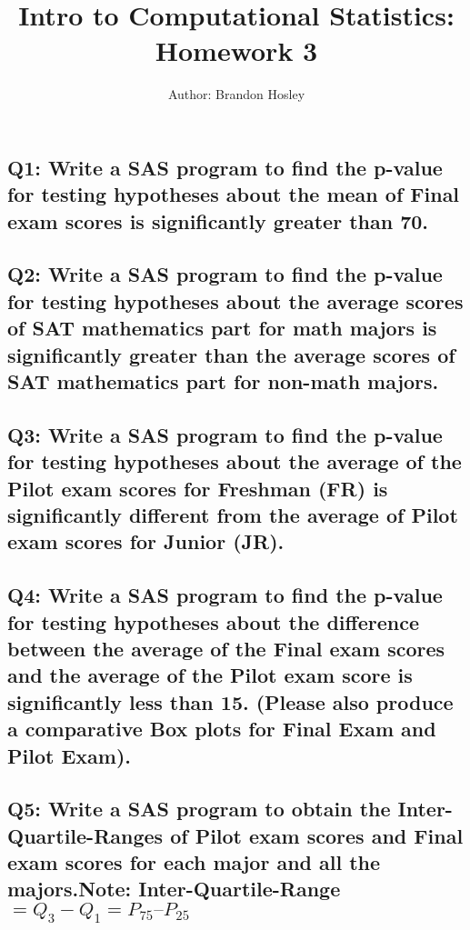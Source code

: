 \documentclass[a4paper,man,natbib]{apa6}
\title{Intro to Computational Statistics: Homework 3}
\author{Author: Brandon Hosley}
\affiliation{Instructor: Liang Kong, Ph.D}
\begin{document}
\maketitle
\singlespacing
	
\subsection*{Q1: Write a SAS program to find the p-value for testing hypotheses about the mean of Final exam scores is significantly greater than 70. }
%

\subsection*{Q2: Write a SAS program to find the p-value for testing hypotheses about the average scores of SAT mathematics part for math majors is significantly greater than the average scores of SAT mathematics part for non-math majors. }


\subsection*{Q3: Write a SAS program to find the p-value for testing hypotheses about the average of the Pilot exam scores for Freshman (FR) is significantly different from the average of Pilot exam scores for Junior (JR). }


\subsection*{Q4: Write a SAS program to find the p-value for testing hypotheses about the difference between the average of the Final exam scores and the average of the Pilot exam score is significantly less than 15.  (Please also produce a comparative Box plots for Final Exam and Pilot Exam). }


\subsection*{Q5: Write a SAS program to obtain the Inter-Quartile-Ranges of Pilot exam scores and Final exam scores for each major and all the majors.Note: Inter-Quartile-Range $=Q_3-Q_1=P_{75}–P_{25}$ }
\end{document}
